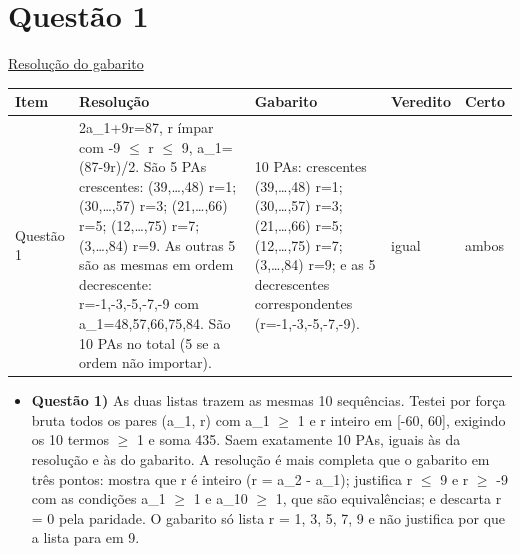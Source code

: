 \documentclass{article}%
\begin{document}
\section*{Questão 1}%
\href{https://poliedroresolve.sistemapoliedro.com.br/vestibulares/ita/2027/ita-2-fase-dia-1-20-10-2026-2-fase-dia-1/dissertativa-1-matematica-2-fase-dia-1-ita-2027}{Resolução do gabarito}\par\smallskip%
\begin{longtable}{@{}p{} p{} p{} p{} p{}@{}}\toprule Item & Resolução & Gabarito & Veredito & Certo \\ \midrule
Questão 1 & 2a\_1+9r=87, r ímpar com {-}9 $\leq$ r $\leq$ 9, a\_1=(87{-}9r)/2. São 5 PAs crescentes: (39,\ldots{},48) r=1; (30,\ldots{},57) r=3; (21,\ldots{},66) r=5; (12,\ldots{},75) r=7; (3,\ldots{},84) r=9. As outras 5 são as mesmas em ordem decrescente: r={-}1,{-}3,{-}5,{-}7,{-}9 com a\_1=48,57,66,75,84. São 10 PAs no total (5 se a ordem não importar). & 10 PAs: crescentes (39,\ldots{},48) r=1; (30,\ldots{},57) r=3; (21,\ldots{},66) r=5; (12,\ldots{},75) r=7; (3,\ldots{},84) r=9; e as 5 decrescentes correspondentes (r={-}1,{-}3,{-}5,{-}7,{-}9). & igual & ambos \\
\bottomrule\end{longtable}%
\begin{itemize}%
\item%
\textbf{Questão 1)} As duas listas trazem as mesmas 10 sequências. Testei por força bruta todos os pares (a\_1, r) com a\_1 $\geq$ 1 e r inteiro em {[}{-}60, 60{]}, exigindo os 10 termos $\geq$ 1 e soma 435. Saem exatamente 10 PAs, iguais às da resolução e às do gabarito. A resolução é mais completa que o gabarito em três pontos: mostra que r é inteiro (r = a\_2 - a\_1); justifica r $\leq$ 9 e r $\geq$ -9 com as condições a\_1 $\geq$ 1 e a\_10 $\geq$ 1, que são equivalências; e descarta r = 0 pela paridade. O gabarito só lista r = 1, 3, 5, 7, 9 e não justifica por que a lista para em 9.%
\end{itemize}%
\end{document}
